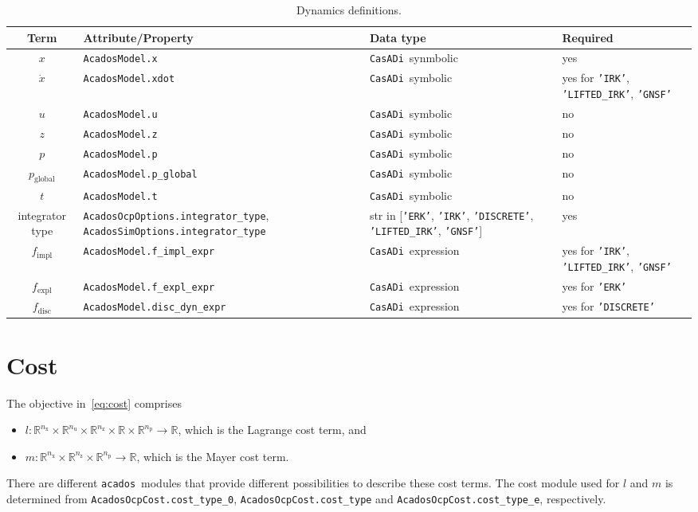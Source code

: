 \documentclass[english]{article}
\newcommand{\code}[1]{\texttt{#1}}
\newcommand{\casadi}{\texttt{CasADi}}
\newcommand{\acados}{\texttt{acados}}
\newcommand{\ind}[1]{_{\textrm{#1}}}
\newcommand{\glob}{_{\textrm{global}}}
\newcommand{\nx}{n\ind{x}}
\newcommand{\nuu}{n\ind{u}}
\newcommand{\nz}{n\ind{z}}
\newcommand{\np}{n\ind{p}}
\newcommand{\mandatory}{yes}
\newcommand{\optional}{no}
\begin{document}
%
\begin{table}[ht!]
\centering
\begin{tabular}{c@{}C{6.7cm}@{}C{5cm}@{}C{3.4cm}}
\toprule
Term & Attribute/Property & Data type & Required \\ \midrule
$x$ & \code{AcadosModel.x} & \casadi~synmbolic & \mandatory \\[3pt]
$\dot{x}$ & \code{AcadosModel.xdot} & \casadi~symbolic & \mandatory{} for \code{'IRK'}, \code{'LIFTED\_IRK'}, \code{'GNSF'}  \\[3pt]
$u$ & \code{AcadosModel.u} & \casadi~symbolic & \optional \\[3pt]
$z$ & \code{AcadosModel.z} & \casadi~symbolic & \optional \\[3pt]
$p$ & \code{AcadosModel.p} & \casadi~symbolic & \optional \\[3pt]
$p\glob$ & \code{AcadosModel.p\_global} & \casadi~symbolic & \optional \\[3pt]
$t$ & \code{AcadosModel.t} & \casadi~symbolic & \optional \\[3pt]
\midrule
integrator type & \code{AcadosOcpOptions.integrator\_type},  \code{AcadosSimOptions.integrator\_type} & str in [\code{'ERK'}, \code{'IRK'}, \code{'DISCRETE'}, \code{'LIFTED\_IRK'}, \code{'GNSF'}] & \mandatory \\[3pt]
\midrule
$ f\ind{impl}$ & \code{AcadosModel.f\_impl\_expr} & \casadi~expression & \mandatory{} for \code{'IRK'}, \code{'LIFTED\_IRK'}, \code{'GNSF'} \\[3pt]
$ f\ind{expl}$ & \code{AcadosModel.f\_expl\_expr} & \casadi~expression & \mandatory{} for \code{'ERK'} \\[3pt]
$f\ind{disc}$ & \code{AcadosModel.disc\_dyn\_expr} & \casadi~expression & \mandatory{} for \code{'DISCRETE'}\\[3pt]
\bottomrule
\end{tabular}
\caption{Dynamics definitions.} \label{tab:dynamics}
\end{table}
%
\section{Cost}\label{sec:cost}
%
The objective in~\eqref{eq:cost} comprises
\begin{itemize}
\item $ l: \mathbb{R}^{\nx}\times\mathbb{R}^{\nuu}\times\mathbb{R}^{\nz}\times\mathbb{R}\times\mathbb{R}^{\np} \rightarrow \mathbb{R}$, which is the Lagrange cost term, and
\item $ m: \mathbb{R}^{\nx}\times\mathbb{R}^{\nz}\times\mathbb{R}^{\np} \rightarrow \mathbb{R}$, which is the Mayer cost term.
\end{itemize}
There are different \acados~modules that provide different possibilities to describe these cost terms.
The cost module used for $l$ and $m$ is determined from \code{AcadosOcpCost.cost\_type\_0}, \code{AcadosOcpCost.cost\_type} and \code{AcadosOcpCost.cost\_type\_e}, respectively.
\end{document}
